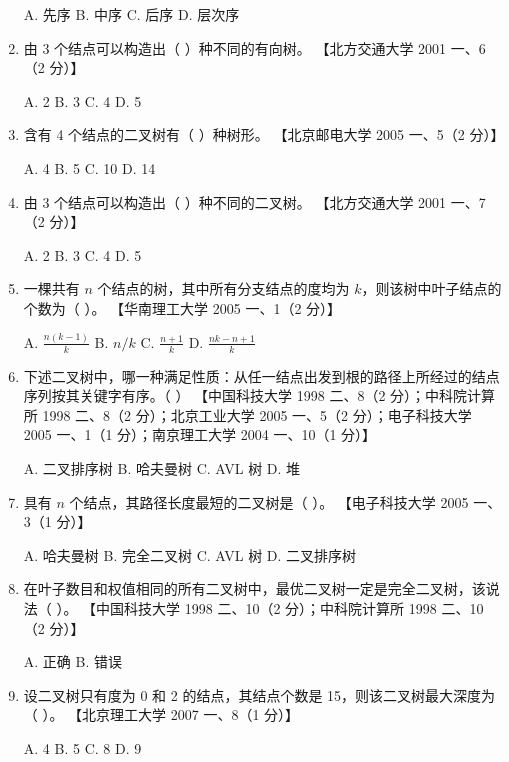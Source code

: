 \documentclass[lang=cn,newtx,10pt,scheme=chinese]{elegantbook}
\begin{document}
\begin{enumerate}
    A. 先序 \quad B. 中序 \quad C. 后序 \quad D. 层次序  

    \item 由 3 个结点可以构造出（ ）种不同的有向树。  
    【北方交通大学 2001 一、6（2 分）】  

    A. 2 \quad B. 3 \quad C. 4 \quad D. 5  

    \item 含有 4 个结点的二叉树有（ ）种树形。  
    【北京邮电大学 2005 一、5（2 分）】  

    A. 4 \quad B. 5 \quad C. 10 \quad D. 14  

    \item 由 3 个结点可以构造出（ ）种不同的二叉树。  
    【北方交通大学 2001 一、7（2 分）】  

    A. 2 \quad B. 3 \quad C. 4 \quad D. 5  

    \item 一棵共有 $n$ 个结点的树，其中所有分支结点的度均为 $k$，则该树中叶子结点的个数为（ ）。  
    【华南理工大学 2005 一、1（2 分）】  

    A. $\frac{n(k-1)}{k}$ \quad B. $n/k$ \quad C. $\frac{n + 1}{k}$ \quad D. $\frac{nk - n + 1}{k}$  

    \item 下述二叉树中，哪一种满足性质：从任一结点出发到根的路径上所经过的结点序列按其关键字有序。（ ）  
    【中国科技大学 1998 二、8（2 分）；中科院计算所 1998 二、8（2 分）；北京工业大学 2005 一、5（2 分）；电子科技大学 2005 一、1（1 分）；南京理工大学 2004 一、10（1 分）】  
    
    A. 二叉排序树 \quad B. 哈夫曼树 \quad C. AVL 树 \quad D. 堆  

    \item 具有 $n$ 个结点，其路径长度最短的二叉树是（ ）。  
    【电子科技大学 2005 一、3（1 分）】 

    A. 哈夫曼树 \quad B. 完全二叉树 \quad C. AVL 树 \quad D. 二叉排序树  

    \item 在叶子数目和权值相同的所有二叉树中，最优二叉树一定是完全二叉树，该说法（ ）。  
    【中国科技大学 1998 二、10（2 分）；中科院计算所 1998 二、10（2 分）】 

    A. 正确 \quad B. 错误  

    \item 设二叉树只有度为 0 和 2 的结点，其结点个数是 15，则该二叉树最大深度为（ ）。  
    【北京理工大学 2007 一、8（1 分）】  

    A. 4 \quad B. 5 \quad C. 8 \quad D. 9  


\end{enumerate}
\end{document}
